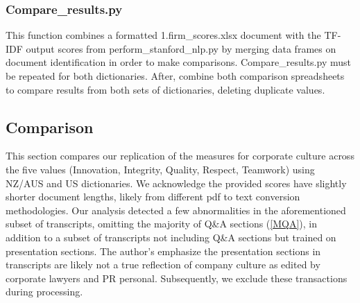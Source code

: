 \documentclass[11pt]{article}
\begin{document}
\subsubsection{Compare\_results.py}
This function combines a formatted 1.firm\_scores.xlsx document with the TF-IDF output scores from perform\_stanford\_nlp.py by merging data frames on document identification in order to make comparisons.
Compare\_results.py must be repeated for both dictionaries.
After, combine both comparison spreadsheets to compare results from both sets of dictionaries, deleting duplicate values.
\subsection{Comparison}
This section compares our replication of the measures for corporate culture across the five values (Innovation, Integrity, Quality, Respect, Teamwork) using NZ/AUS and US dictionaries. 
We acknowledge the provided scores have slightly shorter document lengths, likely from different pdf to text conversion methodologies.
Our analysis detected a few abnormalities in the aforementioned subset of transcripts, omitting the majority of Q\&A sections (\ref{MQA}), in addition to a subset of transcripts not including Q\&A sections but trained on presentation sections.
The author's emphasize the presentation sections in transcripts are likely not a true reflection of company culture as edited by corporate lawyers and PR personal. 
Subsequently, we exclude these transactions during processing.
\end{document}
